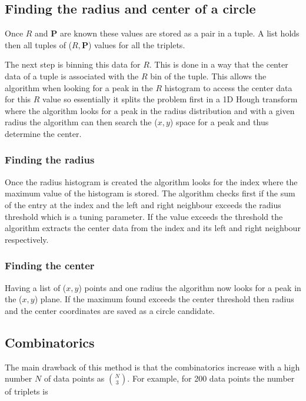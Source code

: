 \documentclass[11pt,twoside]{scrreprt}
\begin{document}
\subsection{Finding the radius and center of a circle} %
\label{sub:finding_the_radius_and_center_of_a_circle}
Once $R$ and $\mathbf{P}$ are known these values are stored as a pair in a tuple. A list holds then all tuples of ($R, \mathbf{P}$) values
for all the triplets.

The next step is binning this data for $R$. This is done in a way that the center data of a tuple is associated with the $R$ bin of the tuple.
This allows the algorithm when looking for a peak in the $R$ histogram to access the center data for this $R$ value so essentially it
splits the problem first in a 1D Hough transform where the algorithm looks for a peak in the radius distribution and with a given radius
the algorithm can then search the ($x,y$) space for a peak and thus determine the center.

\subsubsection{Finding the radius} %
\label{ssub:finding_the_radius}
Once the radius histogram is created the algorithm looks for the index where the maximum value of the histogram is stored. The algorithm
checks first if the sum of the entry at the index and the left and right neighbour exceeds the radius threshold which is a tuning parameter.
If the value exceeds the threshold the algorithm extracts the center data from the index and its left and right neighbour respectively.

\subsubsection{Finding the center} %
\label{ssub:finding_the_center}
Having a list of ($x,y$) points and one radius the algorithm now looks for a peak in the ($x,y$) plane. If the maximum found exceeds the
center threshold then radius and the center coordinates are saved as a circle candidate.


\subsection{Combinatorics}
	

The main drawback of this method is that the combinatorics increase with a high number $N$ of data points as \( \binom{N}{3} \). For example, for 200 data points the number of triplets is
\end{document}
